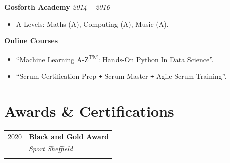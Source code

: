 \documentclass[10pt]{article} %
\begin{document}
\begin{changemargin}{0pt}{0.5pt}
\begin{minipage}[t]{0.44\textwidth}
\begin{changemargin}{5pt}{5pt}
\end{changemargin}


\begin{changemargin}{5pt}{5pt}
	
	\textbf{Gosforth Academy} \hfill \textit{ 2014 --  2016}
	\vspace{-5pt}
	\begin{itemize} \itemsep-2pt %
		\item A Levels: Maths (A), Computing (A), Music (A).
	\end{itemize}
	
\end{changemargin}


\begin{changemargin}{5pt}{5pt}
	
	\textbf{Online Courses}
	\vspace{-5pt}
	\begin{itemize} \itemsep-2pt %
		\item \enquote{Machine Learning A-Z\textsuperscript{TM}: Hands-On Python In Data Science}.
		\item \enquote{Scrum Certification Prep \texttt{+} Scrum Master \texttt{+} Agile Scrum Training}.
	\end{itemize}
	
\end{changemargin}


\section{Awards \& Certifications}

\begin{tabular}{rl}
	
	2020	 & \textbf{Black and Gold Award}\\ & \textit{Sport Sheffield} \\ \\
	

\end{tabular}
\end{minipage}
\end{changemargin}
\end{document}
